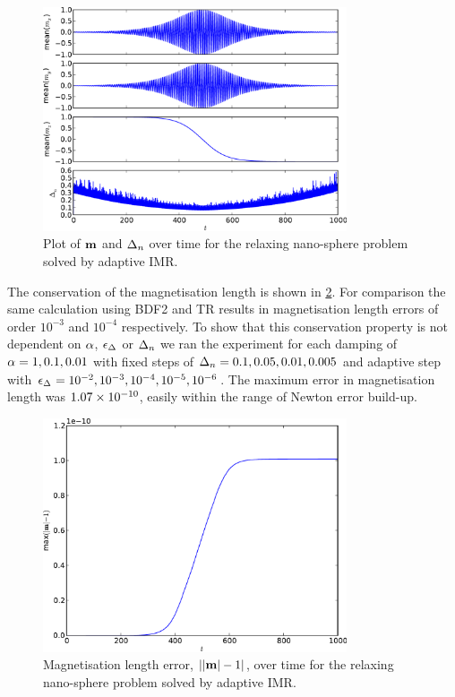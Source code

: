 \begin{figure}
  \centering
  \includegraphics[width=0.8\textwidth]{plots/aimr-sphere-relax/imr-meanmxsvs-meanmysvs-meanmzsvs-dtsvstimes.pdf}
  \caption{Plot of $\mathbf{m}$ and $\Delta_{n}$ over time for the relaxing nano-sphere problem solved by adaptive IMR.}
  \label{fig:imr-llg-ode}
\end{figure}

The conservation of the magnetisation length is shown in \cref{fig:ml-aimr-ode}.
For comparison the same calculation using BDF2 and TR results in magnetisation length errors of order $10^{-3}$ and $10^{-4}$ respectively.
To show that this conservation property is not dependent on $\alpha$, $\epsilon_{\Delta_{}}$ or $\Delta_{n}$ we ran the experiment for each damping of $\alpha= 1, 0.1, 0.01$ with fixed steps of $\Delta_{n}=0.1, 0.05, 0.01, 0.005$ and adaptive step with $\epsilon_{\Delta_{}} =10^{-2}, 10^{-3}, 10^{-4}, 10^{-5}, 10^{-6}$. 
The maximum error in magnetisation length was $1.07\times 10^{-10}$, easily within the range of Newton error build-up.

\begin{figure}
  \centering
  \includegraphics[width=0.8\textwidth]{plots/aimr-sphere-relax/mlengtherrormaxesvstimes.pdf}
  \caption{Magnetisation length error, $\left|{\left|{\mathbf{m}} \right| -1} \right|$, over time for the relaxing nano-sphere problem solved by adaptive IMR.}
  \label{fig:ml-aimr-ode}
\end{figure}

